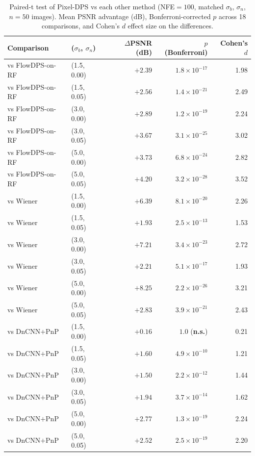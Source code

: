 \documentclass{article}
\begin{document}
\begin{table}[h]
  \centering
  \caption{Paired-t test of Pixel-DPS vs each other method (NFE${=}100$,
    matched $\sigma_b$, $\sigma_n$, $n{=}50$ images). Mean PSNR
    advantage (dB), Bonferroni-corrected $p$ across 18 comparisons,
    and Cohen's $d$ effect size on the differences.}
  \label{tab:significance}
  \begin{tabular}{llrrr}
    \toprule
    Comparison & ($\sigma_b$, $\sigma_n$) & $\Delta$PSNR (dB) & $p$ (Bonferroni) & Cohen's $d$ \\
    \midrule
    vs FlowDPS-on-RF & (1.5, 0.00) & $+2.39$ & $1.8 \times 10^{-17}$ & 1.98 \\
    vs FlowDPS-on-RF & (1.5, 0.05) & $+2.56$ & $1.4 \times 10^{-21}$ & 2.49 \\
    vs FlowDPS-on-RF & (3.0, 0.00) & $+2.89$ & $1.2 \times 10^{-19}$ & 2.24 \\
    vs FlowDPS-on-RF & (3.0, 0.05) & $+3.67$ & $3.1 \times 10^{-25}$ & 3.02 \\
    vs FlowDPS-on-RF & (5.0, 0.00) & $+3.73$ & $6.8 \times 10^{-24}$ & 2.82 \\
    vs FlowDPS-on-RF & (5.0, 0.05) & $+4.20$ & $3.2 \times 10^{-28}$ & 3.52 \\
    \midrule
    vs Wiener        & (1.5, 0.00) & $+6.39$ & $8.1 \times 10^{-20}$ & 2.26 \\
    vs Wiener        & (1.5, 0.05) & $+1.93$ & $2.5 \times 10^{-13}$ & 1.53 \\
    vs Wiener        & (3.0, 0.00) & $+7.21$ & $3.4 \times 10^{-23}$ & 2.72 \\
    vs Wiener        & (3.0, 0.05) & $+2.21$ & $5.1 \times 10^{-17}$ & 1.93 \\
    vs Wiener        & (5.0, 0.00) & $+8.25$ & $2.2 \times 10^{-26}$ & 3.21 \\
    vs Wiener        & (5.0, 0.05) & $+2.83$ & $3.9 \times 10^{-21}$ & 2.43 \\
    \midrule
    vs DnCNN$+$PnP   & (1.5, 0.00) & $+0.16$ & $\mathbf{1.0}$ (\textbf{n.s.}) & 0.21 \\
    vs DnCNN$+$PnP   & (1.5, 0.05) & $+1.60$ & $4.9 \times 10^{-10}$ & 1.21 \\
    vs DnCNN$+$PnP   & (3.0, 0.00) & $+1.50$ & $2.2 \times 10^{-12}$ & 1.44 \\
    vs DnCNN$+$PnP   & (3.0, 0.05) & $+1.94$ & $3.7 \times 10^{-14}$ & 1.62 \\
    vs DnCNN$+$PnP   & (5.0, 0.00) & $+2.77$ & $1.3 \times 10^{-19}$ & 2.24 \\
    vs DnCNN$+$PnP   & (5.0, 0.05) & $+2.52$ & $2.5 \times 10^{-19}$ & 2.20 \\
    \bottomrule
  \end{tabular}
\end{table}
\end{document}
